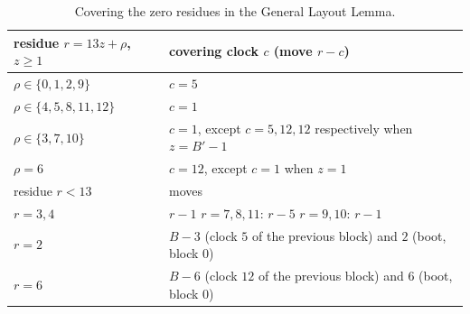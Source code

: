 \documentclass[11pt]{article}
\theoremstyle{definition}
\begin{document}
\begin{table}[t]
\centering\small
\begin{tabular}{ll}
\toprule
residue $r=13z+\rho$, $z\ge1$ & covering clock $c$ (move $r-c$)\\
\midrule
$\rho\in\{0,1,2,9\}$ & $c=5$\\
$\rho\in\{4,5,8,11,12\}$ & $c=1$\\
$\rho\in\{3,7,10\}$ & $c=1$, except $c=5,12,12$ respectively when $z=B'-1$\\
$\rho=6$ & $c=12$, except $c=1$ when $z=1$\\
\midrule
residue $r<13$ & moves\\
\midrule
$r=3,4$ & $r-1$ \qquad $r=7,8,11$: $r-5$ \qquad $r=9,10$: $r-1$\\
$r=2$ & $B-3$ (clock $5$ of the previous block) and $2$ (boot, block $0$)\\
$r=6$ & $B-6$ (clock $12$ of the previous block) and $6$ (boot, block $0$)\\
\bottomrule
\end{tabular}
\caption{Covering the zero residues in the General Layout Lemma.}
\label{tab:cover}
\end{table}
\end{document}
